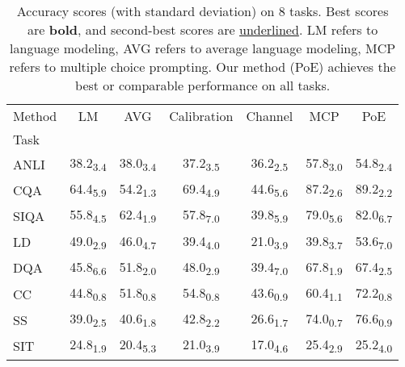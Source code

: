\begin{table}[h]
\centering
\caption{Accuracy scores (with standard deviation) on 8 tasks. Best scores are \textbf{bold}, and second-best scores are \underline{underlined}. LM refers to language modeling, AVG refers to average language modeling, MCP refers to multiple choice prompting. Our method (PoE) achieves the best or comparable performance on all tasks.}
\label{tab:main_exp}
\begin{tabular}{l|c|c|c|c|c|c}
Method & LM & AVG & Calibration & Channel & MCP & PoE \\
Task &  &  &  &  &  &  \\
ANLI & 38.2\textsubscript{3.4} & 38.0\textsubscript{3.4} & 37.2\textsubscript{3.5} & 36.2\textsubscript{2.5} & 57.8\textsubscript{3.0} & 54.8\textsubscript{2.4} \\
CQA & 64.4\textsubscript{5.9} & 54.2\textsubscript{1.3} & 69.4\textsubscript{4.9} & 44.6\textsubscript{5.6} & 87.2\textsubscript{2.6} & 89.2\textsubscript{2.2} \\
SIQA & 55.8\textsubscript{4.5} & 62.4\textsubscript{1.9} & 57.8\textsubscript{7.0} & 39.8\textsubscript{5.9} & 79.0\textsubscript{5.6} & 82.0\textsubscript{6.7} \\
LD & 49.0\textsubscript{2.9} & 46.0\textsubscript{4.7} & 39.4\textsubscript{4.0} & 21.0\textsubscript{3.9} & 39.8\textsubscript{3.7} & 53.6\textsubscript{7.0} \\
DQA & 45.8\textsubscript{6.6} & 51.8\textsubscript{2.0} & 48.0\textsubscript{2.9} & 39.4\textsubscript{7.0} & 67.8\textsubscript{1.9} & 67.4\textsubscript{2.5} \\
CC & 44.8\textsubscript{0.8} & 51.8\textsubscript{0.8} & 54.8\textsubscript{0.8} & 43.6\textsubscript{0.9} & 60.4\textsubscript{1.1} & 72.2\textsubscript{0.8} \\
SS & 39.0\textsubscript{2.5} & 40.6\textsubscript{1.8} & 42.8\textsubscript{2.2} & 26.6\textsubscript{1.7} & 74.0\textsubscript{0.7} & 76.6\textsubscript{0.9} \\
SIT & 24.8\textsubscript{1.9} & 20.4\textsubscript{5.3} & 21.0\textsubscript{3.9} & 17.0\textsubscript{4.6} & 25.4\textsubscript{2.9} & 25.2\textsubscript{4.0} \\
\end{tabular}
\end{table}
